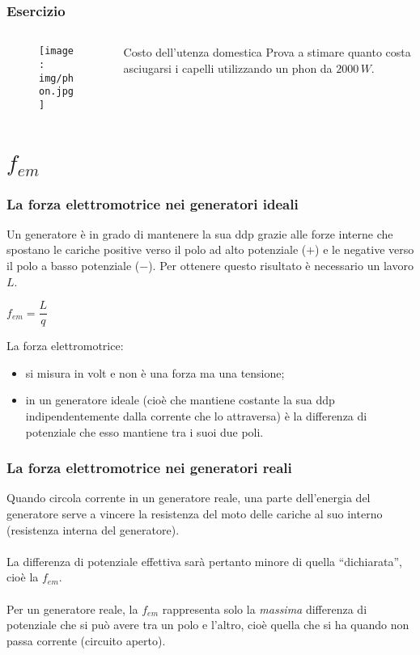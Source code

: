 \documentclass[]{beamer}
\theoremstyle{plain}
\newcommand{\fem}{f_{em}}
\begin{document}
\begin{frame}
\frametitle{Esercizio}
\begin{columns}
\begin{column}{.35\textwidth}
  \begin{figure}
    \texttt{[image: img/phon.jpg]}
  \end{figure}
\end{column}
\begin{column}{.6\textwidth}
  \begin{exampleblock}{Costo dell'utenza domestica}
    \small{
    Prova a stimare quanto costa asciugarsi i capelli utilizzando un phon da $ 2000 \, W $.}
  \end{exampleblock}
\end{column}
\end{columns}
\end{frame}


\section{$ \fem $}


\begin{frame}
  \frametitle{La forza elettromotrice nei generatori ideali}
  Un generatore è in grado di mantenere la sua ddp grazie alle forze interne che spostano le cariche positive verso il polo ad alto potenziale ($+$) e le negative verso il polo a basso potenziale ($-$).
  \pause
  Per ottenere questo risultato è necessario un \alert{lavoro} $ L $.\pause
  \begin{center}
\colorbox{blue!30}{$ \fem = \dfrac{L}{q} $}
\end{center}\pause
La forza elettromotrice:
\begin{itemize}
  \item si misura in volt e non è una forza ma una tensione;\pause
  \item in un generatore ideale (cioè che mantiene costante la sua ddp indipendentemente dalla corrente che lo attraversa) è la differenza di potenziale che esso mantiene tra i suoi due poli.
\end{itemize}
\end{frame}





\begin{frame}
  \frametitle{La forza elettromotrice nei generatori reali}
  Quando circola corrente in un generatore reale, una parte dell'energia del generatore serve a vincere la resistenza del moto delle cariche al suo interno (\alert{resistenza interna del generatore}).\pause\\~\\
  La differenza di potenziale effettiva sarà pertanto minore di quella ``dichiarata'', cioè la $ \fem $.
  \pause\\~\\
  Per un generatore reale, la $ \fem $ rappresenta solo la \emph{massima} differenza di potenziale che si può avere tra un polo e l'altro, cioè quella che si ha quando non passa corrente (circuito aperto).
\end{frame}
\end{document}
